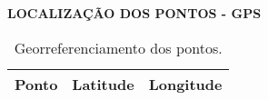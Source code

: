 \newpage
\textbf{LOCALIZAÇÃO DOS PONTOS - GPS}

\begin{table}[!h]
	\centering
	\caption{Georreferenciamento dos pontos.}
	\begin{tabular}{|c|c|c|}
		\hline
		\cellcolor{black!10} \textbf{Ponto} & \cellcolor{black!10} \textbf{Latitude} & \cellcolor{black!10} \textbf{Longitude} \\ \hline
		
		
	\end{tabular}
\end{table}